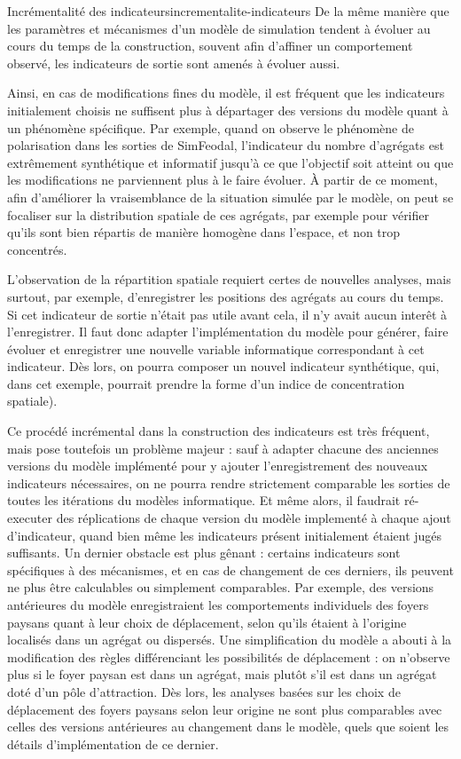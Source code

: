 \begin{encadre}{Incrémentalité des indicateurs}{incrementalite-indicateurs}
De la même manière que les paramètres et mécanismes d'un modèle de simulation tendent à évoluer\footnotemark{} au cours du temps de la construction, souvent afin d'affiner un comportement observé, les indicateurs de sortie sont amenés à évoluer aussi.

Ainsi, en cas de modifications fines du modèle, il est fréquent que les indicateurs initialement choisis ne suffisent plus à départager des versions du modèle quant à un phénomène spécifique.
Par exemple, quand on observe le phénomène de polarisation dans les sorties de SimFeodal, l'indicateur du nombre d'agrégats est extrêmement synthétique et informatif jusqu'à ce que l'objectif soit atteint ou que les modifications ne parviennent plus à le faire évoluer.
À partir de ce moment, afin d'améliorer la vraisemblance de la situation simulée par le modèle, on peut se focaliser sur la distribution spatiale de ces agrégats, par exemple pour vérifier qu'ils sont bien répartis de manière homogène dans l'espace, et non trop concentrés.

L'observation de la répartition spatiale requiert certes de nouvelles analyses, mais surtout, par exemple, d'enregistrer les positions des agrégats au cours du temps.
Si cet indicateur de sortie n'était pas utile avant cela, il n'y avait aucun interêt à l'enregistrer.
Il faut donc adapter l'implémentation du modèle pour générer, faire évoluer et enregistrer une nouvelle variable informatique correspondant à cet indicateur.
Dès lors, on pourra composer un nouvel indicateur synthétique, qui, dans cet exemple, pourrait prendre la forme d'un indice de concentration spatiale).

Ce procédé incrémental dans la construction des indicateurs est très fréquent, mais pose toutefois un problème majeur :
sauf à adapter chacune des anciennes versions du modèle implémenté pour y ajouter l'enregistrement des nouveaux indicateurs nécessaires, on ne pourra rendre strictement comparable les sorties de toutes les itérations du modèles informatique.
Et même alors, il faudrait ré-executer des réplications de chaque version du modèle implementé à chaque ajout d'indicateur, quand bien même les indicateurs présent initialement étaient jugés suffisants.
Un dernier obstacle est plus gênant :
certains indicateurs sont spécifiques à des mécanismes, et en cas de changement de ces derniers, ils peuvent ne plus être calculables ou simplement comparables.
Par exemple, des versions antérieures du modèle enregistraient les comportements individuels des foyers paysans quant à leur \og choix\fg{} de déplacement, selon qu'ils étaient à l'origine localisés dans un agrégat ou dispersés.
Une simplification du modèle a abouti à la modification des règles différenciant les possibilités de déplacement :
on n'observe plus si le foyer paysan est dans un agrégat, mais plutôt s'il est dans un agrégat doté d'un pôle d'attraction.
Dès lors, les analyses basées sur les choix de déplacement des foyers paysans selon leur origine ne sont plus comparables avec celles des versions antérieures au changement dans le modèle, quels que soient les détails d'implémentation de ce dernier.


\end{encadre}
